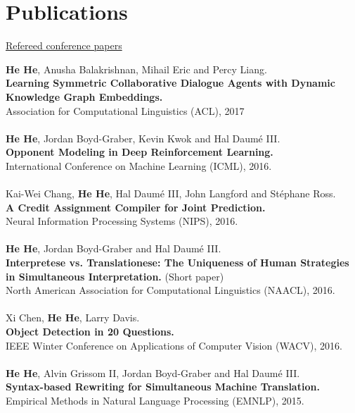 \documentclass[a4paper,11pt]{article}
\begin{document}
\pagestyle{empty} %

\section{Publications}
{\underline{Refereed conference papers}}

{\bf He He}, Anusha Balakrishnan, Mihail Eric and Percy Liang.\\
{\bf Learning Symmetric Collaborative Dialogue Agents with Dynamic Knowledge Graph Embeddings.}\\
Association for Computational Linguistics (ACL), 2017\\
\\
{\bf He He}, Jordan Boyd-Graber, Kevin Kwok and Hal Daum\'e III.\\
{\bf Opponent Modeling in Deep Reinforcement Learning.}\\
International Conference on Machine Learning (ICML), 2016.\\
\\
Kai-Wei Chang, {\bf He He}, Hal Daum\'e III, John Langford and St\'ephane Ross.\\
{\bf A Credit Assignment Compiler for Joint Prediction.}\\
Neural Information Processing Systems (NIPS), 2016.\\ 
\\
{\bf He He}, Jordan Boyd-Graber and Hal Daum\'e III.\\
{\bf Interpretese vs. Translationese: The Uniqueness of Human Strategies in Simultaneous Interpretation.} (Short paper)\\
North American Association for Computational Linguistics (NAACL), 2016.\\
\\
Xi Chen, {\bf He He}, Larry Davis.\\
{\bf Object Detection in 20 Questions.}\\
IEEE Winter Conference on Applications of Computer Vision (WACV), 2016.\\
\\
{\bf He He}, Alvin Grissom II, Jordan Boyd-Graber and Hal Daum\'e III.\\
{\bf Syntax-based Rewriting for Simultaneous Machine Translation.}\\
Empirical Methods in Natural Language Processing (EMNLP), 2015.\\
\\
\end{document}
